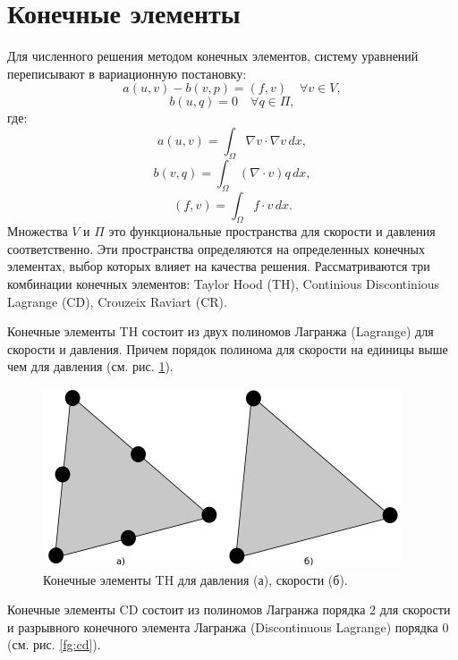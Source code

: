 \documentclass[12pt]{article}
\begin{document}
\section{Конечные элементы}
Для численного решения методом конечных элементов, систему уравнений переписывают в вариационную постановку:
\begin{equation}
a(u,v)-b(v,p)=(f,v) \quad \forall v \in V,
\end{equation}
\begin{equation}
b(u,q)=0 \quad \forall q \in \Pi,
\end{equation}
где: 
\begin{equation}
a(u,v)=\int_\Omega \nabla v \cdot \nabla v \, dx,
\end{equation}
\begin{equation}
b(v,q)=\int_\Omega (\nabla \cdot v) q \, dx,
\end{equation}
\begin{equation}
(f,v)=\int_\Omega f \cdot v \, dx.
\end{equation}
Множества $V$ и $\Pi$ это функциональные пространства для скорости и давления соответственно. Эти пространства определяются на определенных конечных элементах, выбор которых влияет на качества решения. Рассматриваются три комбинации конечных элементов: Taylor Hood (TH), Continious Discontinious Lagrange (CD), Crouzeix Raviart (CR). 

Конечные элементы TH состоит из двух полиномов Лагранжа (Lagrange) для скорости и давления. Причем порядок полинома для скорости на единицы выше чем для давления (см. рис. \ref{fg:th}).

\begin{figure}
	\begin{center}
		\includegraphics[width=400px]{pics/TH}
		\caption{Конечные элементы TH для давления (а), скорости (б).}
		\label{fg:th}
	\end{center}
\end{figure}

Конечные элементы CD состоит из полиномов Лагранжа порядка 2 для скорости и разрывного конечного элемента Лагранжа (Discontinuous Lagrange) порядка 0 (см. рис. \ref{fg:cd}).
\end{document}
